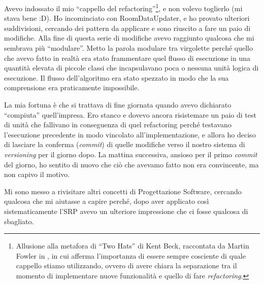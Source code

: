 \documentclass[12pt]{report}
\begin{document}
Avevo indossato il mio ``cappello del refactoring''\footnote{
Allusione alla metafora di ``Two Hats'' di Kent Beck, raccontata
da Martin Fowler in \cite{fowler2002}, in cui afferma l'importanza di
essere sempre cosciente di quale cappello stiamo utilizzando, ovvero 
di avere chiara la separazione tra il momento di implementare nuove 
funzionalità e quello di fare \textit{refactoring}.
}, e non volevo toglierlo (mi stava bene :D). 
Ho incominciato con RoomDataUpdater,
e ho provato ulteriori suddivisioni, cercando dei pattern 
da applicare e sono riuscito a fare un paio di modifiche. Alla fine di questa
serie di modifiche avevo raggiunto qualcosa che mi sembrava più ``modulare''.
Metto la parola modulare tra virgolette perché quello che avevo fatto in realtà
era stato frammentare quel flusso di esecuzione in una quantità elevata di
piccole classi che incapsulavano poca o nessuna unità logica di 
esecuzione. Il flusso dell'algoritmo era stato spezzato in modo che la sua
comprensione era praticamente impossibile.

La mia fortuna è che si trattava di fine giornata quando avevo dichiarato 
``compiuta'' quell'impresa. Ero stanco e dovevo ancora risistemare un paio
di test di unità che fallivano in conseguenza di quel refactoring perché
testavano l'esecuzione precedente in modo vincolato all'implementazione, e
allora ho deciso di lasciare la conferma (\textit{commit}) 
di quelle modifiche verso il nostro sistema di \textit{versioning}
per il giorno dopo.
La mattina successiva, ansioso per il primo \textit{commit} del giorno,
ho sentito di nuovo che ciò che avevamo fatto non era convincente,
ma non capivo il motivo.


Mi sono messo a rivisitare altri concetti di Progettazione 
Software, cercando qualcosa che mi
aiutasse a capire perché, dopo aver applicato così sistematicamente l'SRP
avevo un ulteriore impressione che ci fosse qualcosa di sbagliato.
\end{document}
